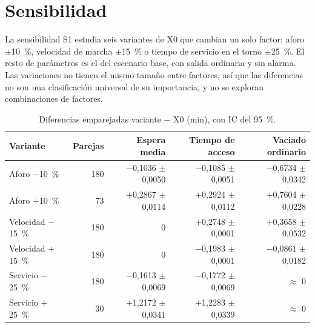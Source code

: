 \section{Sensibilidad}\label{sec:sensibilidad}

La sensibilidad S1 estudia seis variantes de X0 que cambian un solo factor:
aforo $\pm$10~\%, velocidad de marcha $\pm$15~\% o tiempo de servicio en el torno
$\pm$25~\%. El resto de parámetros es el del escenario base, con salida ordinaria
y sin alarma. Las variaciones no tienen el mismo tamaño entre factores, así que
las diferencias no son una clasificación universal de su importancia, y no se
exploran combinaciones de factores.

\begin{table}[htbp]
\centering\small
\caption{Diferencias emparejadas variante $-$ X0 (min), con IC del 95~\%.}
\label{tab:s1}
\begin{tabular}{@{}lrrrr@{}}
\toprule
Variante & Parejas & Espera media & Tiempo de acceso & Vaciado ordinario \\
\midrule
Aforo $-$10~\% & 180 & $-$0,1036 $\pm$ 0,0050 & $-$0,1085 $\pm$ 0,0051 & $-$0,6734 $\pm$ 0,0342 \\
Aforo $+$10~\% & 73 & $+$0,2867 $\pm$ 0,0114 & $+$0,2924 $\pm$ 0,0112 & $+$0,7604 $\pm$ 0,0228 \\
Velocidad $-$15~\% & 180 & 0 & $+$0,2748 $\pm$ 0,0001 & $+$0,3658 $\pm$ 0,0532 \\
Velocidad $+$15~\% & 180 & 0 & $-$0,1983 $\pm$ 0,0001 & $-$0,0861 $\pm$ 0,0182 \\
Servicio $-$25~\% & 180 & $-$0,1613 $\pm$ 0,0069 & $-$0,1772 $\pm$ 0,0069 & $\approx$ 0 \\
Servicio $+$25~\% & 30 & $+$1,2172 $\pm$ 0,0341 & $+$1,2283 $\pm$ 0,0339 & $\approx$ 0 \\
\bottomrule
\end{tabular}
\end{table}

